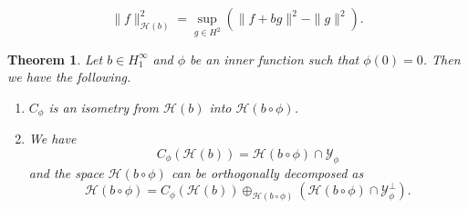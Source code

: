 \documentclass[10pt,a4paper]{amsart}
\newtheorem{theorem}{Theorem}
\def\HH{{\mathcal H}}
\def\YY{{\mathcal Y}}
\begin{document}
\begin{equation}\label{eq:norm in H(b)}
\| f \|_{\HH(b)}^2=\sup_{g\in H^2}(\|  f+bg \|^2-\|  g \|^2).
\end{equation}

\begin{theorem}\label{th:compo inner}
	Let $b \in H^{\infty}_{1}$ and $\phi$ be an inner function such that $\phi(0) = 0$. Then we have the following. 
\begin{enumerate}
    \item  $C_\phi$ is an isometry from $\mathcal{H}(b)$ into $\mathcal{H}(b \circ \phi)$.
    \item We have 
    $$C_\phi(\HH(b))=\HH(b\circ\phi)\cap\YY_\phi$$ and the space $\HH(b\circ\phi)$ can be orthogonally decomposed as
		\begin{equation}\label{eq:decomp H(b circ phi)}
			\HH(b\circ\phi)= C_\phi(\HH(b))\oplus_{	\HH(b\circ\phi)} 	\left(\HH(b\circ\phi)\cap\YY_\phi^\perp\right).
		\end{equation}
\end{enumerate}		 
\end{theorem}
\end{document}
